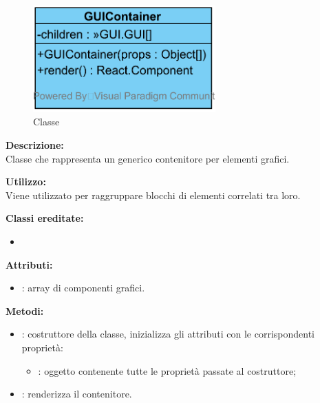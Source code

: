 \paragraph[::GUIContainer]{\class}\mbox{}\\ \label{\class}
\begin{figure}[H]
	\centering
	\includegraphics[width=7cm]{./diagrammi/framework/view/guicontainer.png}
	\caption{Classe \class}
\end{figure}
\textbf{Descrizione:}\\
Classe che rappresenta un generico contenitore per elementi grafici.

\textbf{Utilizzo:}\\
Viene utilizzato per raggruppare blocchi di elementi correlati tra loro.

\textbf{Classi ereditate:}
\begin{itemize}
	\item {}
\end{itemize}


\textbf{Attributi:}
\begin{itemize}
	\item {}: array di componenti grafici.
\end{itemize}

\textbf{Metodi:}
\begin{itemize}
	\item {}: costruttore della classe, inizializza gli attributi con le corrispondenti proprietà:
	\begin{itemize}
		\item {}: oggetto contenente tutte le proprietà passate al costruttore;
	\end{itemize}
	\item {}: renderizza il contenitore.
\end{itemize}

